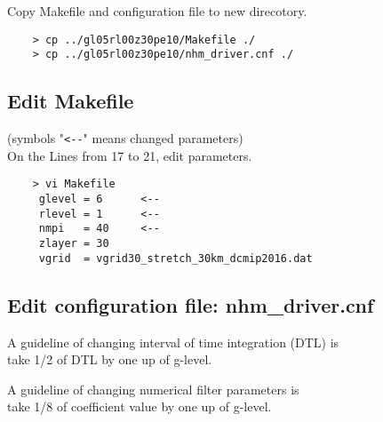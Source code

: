  \noindent Copy Makefile and configuration file to new direcotory.
 \begin{verbatim}
    > cp ../gl05rl00z30pe10/Makefile ./
    > cp ../gl05rl00z30pe10/nhm_driver.cnf ./
 \end{verbatim}

\subsection{Edit Makefile}
 (symbols "\verb|<--|" means changed parameters) \\
 On the Lines from 17 to 21, edit parameters.
 \begin{verbatim}
    > vi Makefile
     glevel = 6      <--
     rlevel = 1      <--
     nmpi   = 40     <--
     zlayer = 30
     vgrid  = vgrid30_stretch_30km_dcmip2016.dat
 \end{verbatim}

\subsection{Edit configuration file: nhm\_driver.cnf}
 \noindent A guideline of changing interval of time integration (DTL) is \\
 {\sf take 1/2 of DTL by one up of g-level}.

 \noindent A guideline of changing numerical filter parameters is \\
 {\sf take 1/8 of coefficient value by one up of g-level}. \\

